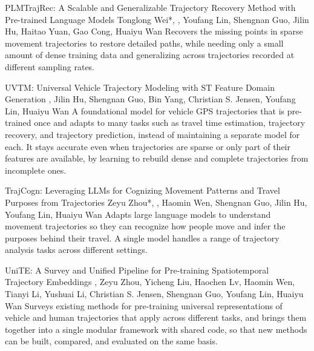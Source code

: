 {PLMTrajRec: A Scalable and Generalizable Trajectory Recovery Method with Pre-trained Language Models}
{Tonglong Wei*, \me*, Youfang Lin, Shengnan Guo, Jilin Hu, Haitao Yuan, Gao Cong, Huaiyu Wan}
{Recovers the missing points in sparse movement trajectories to restore detailed paths, while needing only a small amount of dense training data and generalizing across trajectories recorded at different sampling rates.}

{UVTM: Universal Vehicle Trajectory Modeling with ST Feature Domain Generation}
{\me, Jilin Hu, Shengnan Guo, Bin Yang, Christian S. Jensen, Youfang Lin, Huaiyu Wan}
{A foundational model for vehicle GPS trajectories that is pre-trained once and adapts to many tasks such as travel time estimation, trajectory recovery, and trajectory prediction, instead of maintaining a separate model for each. It stays accurate even when trajectories are sparse or only part of their features are available, by learning to rebuild dense and complete trajectories from incomplete ones.}

{TrajCogn: Leveraging LLMs for Cognizing Movement Patterns and Travel Purposes from Trajectories}
{Zeyu Zhou*, \me*, Haomin Wen, Shengnan Guo, Jilin Hu, Youfang Lin, Huaiyu Wan}
{Adapts large language models to understand movement trajectories so they can recognize how people move and infer the purposes behind their travel. A single model handles a range of trajectory analysis tasks across different settings.}

{UniTE: A Survey and Unified Pipeline for Pre-training Spatiotemporal Trajectory Embeddings}
{\me, Zeyu Zhou, Yicheng Liu, Haochen Lv, Haomin Wen, Tianyi Li, Yushuai Li, Christian S. Jensen, Shengnan Guo, Youfang Lin, Huaiyu Wan}
{Surveys existing methods for pre-training universal representations of vehicle and human trajectories that apply across different tasks, and brings them together into a single modular framework with shared code, so that new methods can be built, compared, and evaluated on the same basis.}

